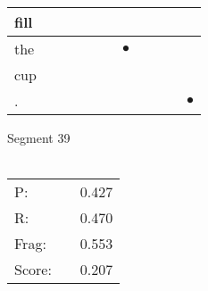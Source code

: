 \documentclass[landscape]{article}
\newcommand{\ssp}{\hspace{2pt}}
\newcommand{\mex}{\cellcolor{g}$\bullet$}
\begin{document}
\begin{tabular}{|l|p{10pt}|p{10pt}|p{10pt}|p{10pt}|p{10pt}|p{10pt}|p{10pt}|p{10pt}|p{10pt}|p{10pt}|}
\hline
\ssp fill \ssp&\hspace{2pt}&\hspace{2pt}&\hspace{2pt}&\hspace{2pt}&\hspace{2pt}&\hspace{2pt}&\hspace{2pt}&\hspace{2pt}&\hspace{2pt}&\hspace{2pt}\\
\hline
\ssp \cellcolor{ref5}the \ssp&\hspace{2pt}&\hspace{2pt}&\hspace{2pt}&\hspace{2pt}&\hspace{2pt}&\hspace{2pt}\mex&\hspace{2pt}&\hspace{2pt}&\hspace{2pt}&\hspace{2pt}\\
\hline
\ssp cup \ssp&\hspace{2pt}&\hspace{2pt}&\hspace{2pt}&\hspace{2pt}&\hspace{2pt}&\hspace{2pt}&\hspace{2pt}&\hspace{2pt}&\hspace{2pt}&\hspace{2pt}\\
\hline
\ssp \cellcolor{ref9}. \ssp&\hspace{2pt}&\hspace{2pt}&\hspace{2pt}&\hspace{2pt}&\hspace{2pt}&\hspace{2pt}&\hspace{2pt}&\hspace{2pt}&\hspace{2pt}&\hspace{2pt}\mex\\
\hline
\end{tabular}

\vspace{6pt}
\noindent Segment 39\\\\
\noindent\begin{tabular}{lm{12pt}r}
\hline
P:&&0.427\\
R:&&0.470\\
Frag:&&0.553\\
Score:&&0.207\\
\end{tabular}
\end{document}
